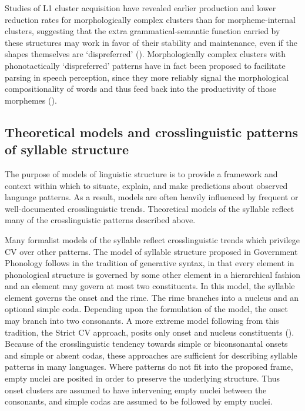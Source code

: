   Studies of L1 cluster acquisition have revealed earlier production and lower reduction rates for morphologically complex clusters than for morpheme-internal clusters, suggesting that the extra grammatical-semantic function carried by these structures may work in favor of their stability and maintenance, even if the shapes themselves are ‘dispreferred’ (\citealt{Kamandulyte2006,Zydorowicz2010}). Morphologically complex clusters with phonotactically ‘dispreferred’ patterns have in fact been proposed to facilitate parsing in speech perception, since they more reliably signal the morphological compositionality of words and thus feed back into the productivity of those morphemes (\citealt{HayBaayen2003,DresslerEtAl2010}). 

\subsection{Theoretical models and crosslinguistic patterns of syllable structure}\label{sec:1.1.3}

  The purpose of models of linguistic structure is to provide a framework and context within which to situate, explain, and make predictions about observed language patterns. As a result, models are often heavily influenced by frequent or well-documented crosslinguistic trends. Theoretical models of the syllable reflect many of the crosslinguistic patterns described above. 

  Many formalist models of the syllable reflect crosslinguistic trends which privilege CV over other patterns. The model of syllable structure proposed in Government Phonology \citep{KayeEtAl1990} follows in the tradition of generative syntax, in that every element in phonological structure is governed by some other element in a hierarchical fashion and an element may govern at most two constituents. In this model, the syllable element governs the onset and the rime. The rime branches into a nucleus and an optional simple coda. Depending upon the formulation of the model, the onset may branch into two consonants. A more extreme model following from this tradition, the Strict CV approach, posits only onset and nucleus constituents (\citealt{Lowenstamm1996,Scheer2004}). Because of the crosslinguistic tendency towards simple or biconsonantal onsets and simple or absent codas, these approaches are sufficient for describing syllable patterns in many languages. Where patterns do not fit into the proposed frame, empty nuclei are posited in order to preserve the underlying structure. Thus onset clusters are assumed to have intervening empty nuclei between the consonants, and simple codas are assumed to be followed by empty nuclei.

